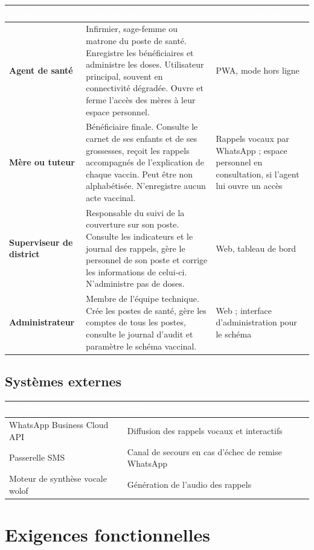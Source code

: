 \documentclass[11pt,a4paper]{article}
\newcommand{\hd}[1]{\textcolor{white}{\sffamily\bfseries\small #1}}
\newcommand{\rowhead}{\rowcolor{primary}}
\begin{document}
\noindent
\begin{tabularx}{\textwidth}{@{}R{3.2cm} L R{3.1cm}@{}}
\toprule
\rowhead \hd{Acteur} & \hd{Description} & \hd{Accès principal} \\
\midrule
\textbf{Agent de santé} & Infirmier, sage-femme ou matrone du poste de santé. Enregistre les bénéficiaires et administre les doses. Utilisateur principal, souvent en connectivité dégradée.  Ouvre et ferme l'accès des mères à leur espace personnel. & PWA, mode hors ligne \\
\textbf{Mère ou tuteur} & Bénéficiaire finale. Consulte le carnet de ses enfants et de ses grossesses, reçoit les rappels accompagnés de l'explication de chaque vaccin. Peut être non alphabétisée. N'enregistre aucun acte vaccinal. & Rappels vocaux par WhatsApp ; espace personnel en consultation, si l'agent lui ouvre un accès \\
\textbf{Superviseur de district} & Responsable du suivi de la couverture sur son poste. Consulte les indicateurs et le journal des rappels, gère le personnel de son poste et corrige les informations de celui-ci. N'administre pas de doses. & Web, tableau de bord \\
\textbf{Administrateur} & Membre de l'équipe technique. Crée les postes de santé, gère les comptes de tous les postes, consulte le journal d'audit et paramètre le schéma vaccinal. & Web ; interface d'administration pour le schéma \\
\bottomrule
\end{tabularx}

\subsection{Systèmes externes}

\noindent
\begin{tabularx}{\textwidth}{@{}R{5.6cm} L@{}}
\toprule
\rowhead \hd{Système} & \hd{Rôle} \\
\midrule
WhatsApp Business Cloud API & Diffusion des rappels vocaux et interactifs \\
Passerelle SMS & Canal de secours en cas d'échec de remise WhatsApp \\
Moteur de synthèse vocale wolof & Génération de l'audio des rappels \\
\bottomrule
\end{tabularx}

\section{Exigences fonctionnelles}
\end{document}
